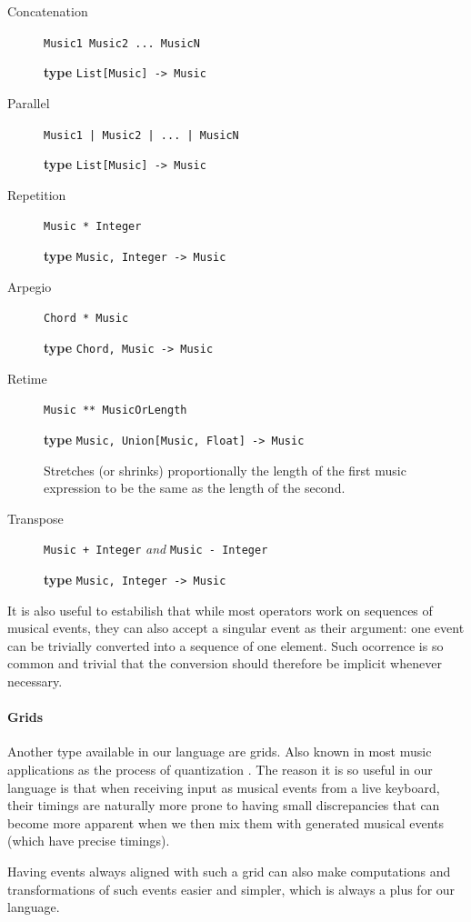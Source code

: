 \documentclass[a4paper,UKenglish,cleveref, autoref]{oasics-v2019}
\begin{document}
\begin{description}
    \item[Concatenation] \verb|Music1 Music2 ... MusicN|
    
        \textbf{type} \verb|List[Music] -> Music|
    \item[Parallel] \verb'Music1 | Music2 | ... | MusicN'
        
        \textbf{type} \verb|List[Music] -> Music|
    \item[Repetition] \verb'Music * Integer'
    
        \textbf{type} \verb|Music, Integer -> Music|
    \item[Arpegio] \verb'Chord * Music'
        
        \textbf{type} \verb|Chord, Music -> Music|
    \item[Retime] \verb'Music ** MusicOrLength'

        \textbf{type} \verb|Music, Union[Music, Float] -> Music|
        
        Stretches (or shrinks) proportionally the length of the first music expression to be the same as the length of the second.
    \item[Transpose] \verb'Music + Integer' \textit{and} \verb'Music - Integer'
    
        \textbf{type} \verb|Music, Integer -> Music|
\end{description}


It is also useful to estabilish that while most operators work on sequences of musical events, they can also accept a singular event as their argument: one event can be trivially converted into a sequence of one element. Such ocorrence is so common and trivial that the conversion should therefore be implicit whenever necessary.

\paragraph*{Grids}
Another type available in our language are grids. Also known in most music applications as the process of quantization \cite{Quantization}. The reason it is so useful in our language is that when receiving input as musical events from a live keyboard, their timings are naturally more prone to having small discrepancies that can become more apparent when we then mix them with generated musical events (which have precise timings).

Having events always aligned with such a grid can also make computations and transformations of such events easier and simpler, which is always a plus for our language.
\end{document}
